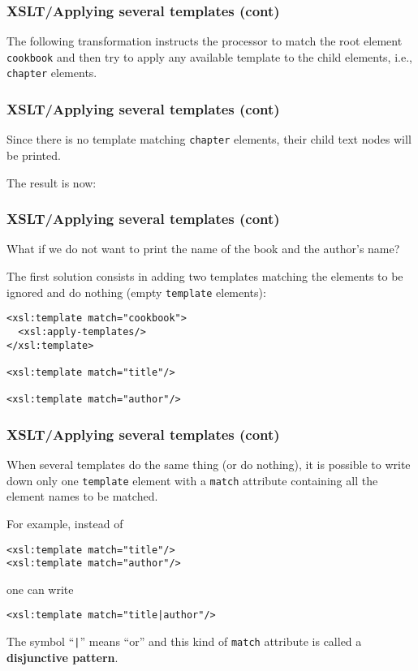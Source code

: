 %
\begin{frame}
\frametitle{XSLT/Applying several templates (cont)}

The following transformation
instructs the \XSLT processor to match the root element
\texttt{cookbook} and then try to apply any available template to the
child elements, i.e., \texttt{chapter} elements.

\end{frame}

%
\begin{frame}
\frametitle{XSLT/Applying several templates (cont)}

Since there is no template matching \texttt{chapter} elements, their
child text nodes will be printed.

\bigskip

The result is now:

\end{frame}

%
\begin{frame}[containsverbatim]
\frametitle{XSLT/Applying several templates (cont)}

What if we do not want to print the name of the book and the author's
name?

\bigskip

The first solution consists in adding two templates matching the
elements to be ignored and do nothing (empty \texttt{template}
elements):
{\small
\begin{verbatim}
<xsl:template match="cookbook">
  <xsl:apply-templates/>
</xsl:template>

<xsl:template match="title"/>

<xsl:template match="author"/>
\end{verbatim}
}

\end{frame}

%
\begin{frame}[containsverbatim]
\frametitle{XSLT/Applying several templates (cont)}

When several templates do the same thing (or do nothing), it is
possible to write down only one \texttt{template} element with a
\texttt{match} attribute containing all the element names to be
matched.

\bigskip

For example, instead of
{\small
\begin{verbatim}
<xsl:template match="title"/>
<xsl:template match="author"/>
\end{verbatim}
}
one can write
{\small
\begin{verbatim}
<xsl:template match="title|author"/>
\end{verbatim}
}
The symbol ``\verb#|#'' means ``or'' and this kind of \texttt{match}
attribute is called a \textbf{disjunctive pattern}.

\end{frame}

